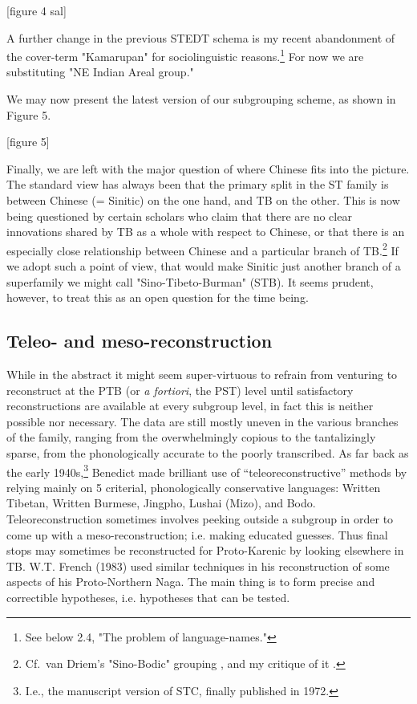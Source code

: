 [figure 4 sal]

A further change in the previous STEDT schema is my recent abandonment of the cover-term "Kamarupan" for sociolinguistic reasons.\footnote{See below 2.4, "The problem of language-names."} For now we are substituting "NE Indian Areal group."

We may now present the latest version of our subgrouping scheme, as shown in Figure 5.

[figure 5]

Finally, we are left with the major question of where Chinese fits into the picture. The standard view has always been that the primary split in the ST family is between Chinese (= Sinitic) on the one hand, and TB on the other. This is now being questioned by certain scholars who claim that there are no clear innovations shared by TB as a whole with respect to Chinese, or that there is an especially close relationship between Chinese and a particular branch of TB.\footnote{Cf.\ van Driem's "Sino-Bodic" grouping \citep{VanDriem1997}, and my critique of it \citep{Matisoff2006}.} If we adopt such a point of view, that would make Sinitic just another branch of a superfamily we might call "Sino-Tibeto-Burman" (STB). It seems prudent, however, to treat this as an open question for the time being.


\subsection{Teleo- and meso-reconstruction}

While in the abstract it might seem super-virtuous to refrain from venturing to reconstruct at the PTB (or {\it a fortiori}, the PST) level until satisfactory reconstructions are available at every subgroup level, in fact this is neither possible nor necessary. The data are still mostly uneven in the various branches of the family, ranging from the overwhelmingly copious to the tantalizingly sparse, from the phonologically accurate to the poorly transcribed. As far back as the early 1940s,\footnote{I.e., the manuscript version of STC, finally published in 1972.} Benedict made brilliant use of “teleoreconstructive” methods by relying mainly on 5 criterial, phonologically conservative languages: Written Tibetan, Written Burmese, Jingpho, Lushai (Mizo), and Bodo. Teleoreconstruction sometimes involves peeking outside a subgroup in order to come up with a meso-reconstruction; i.e. making educated guesses. Thus final stops may sometimes be reconstructed for Proto-Karenic by looking elsewhere in TB. W.T. French (1983) used similar techniques in his reconstruction of some aspects of his Proto-Northern Naga. The main thing is to form precise and correctible hypotheses, i.e. hypotheses that can be tested.

